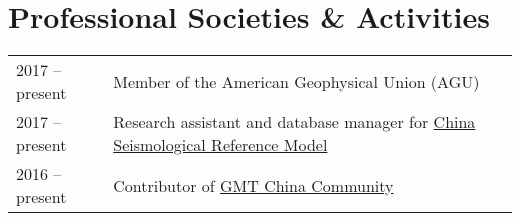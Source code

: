 \section*{Professional Societies \& Activities}

\begin{tabular}{ll}
2017 -- present & Member of the American Geophysical Union (AGU) \\
2017 -- present & Research assistant and database manager for \href{http://chinageorefmodel.org/}{China Seismological Reference Model} \\
2016 -- present & Contributor of \href{http://gmt-china.org/}{GMT China Community} \\
\end{tabular}
